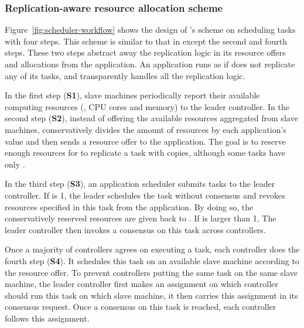 \vspace{-.3in}
\subsubsection{Replication-aware resource allocation scheme}
\label{sec:workflow}\vspace{-.075in}

Figure~\ref{fig:scheduler-workflow} shows the design of \tripod's scheme on 
scheduling tasks with four steps. This scheme is similar to that in \mesos 
except the second and fourth steps. These two steps \tripod abstract away the 
replication logic in its resource offers and allocations from the application. 
An application runs as if \xxx does not replicate any of its tasks, and \tripod 
transparently handles all the replication logic.

In the first step (\textbf{S1}), slave machines periodically report their 
available computing resources (\eg, CPU cores and memory) to the leader 
controller. In the second step (\textbf{S2}), instead of offering the available 
resources aggregated from slave machines, \tripod conservatively divides the 
amount of resources by each application's  value and then sends a 
resource offer to the application. The goal is to reserve enough resources for 
\tripod to replicate a task with  copies, although some tasks have only 
.

In the third step (\textbf{S3}), an application scheduler submits tasks to the 
leader controller. If  is 1, the leader schedules the task without 
consensus and revokes  resources specified in this task from the 
application. By doing so, the conservatively reserved resources are given back 
to \tripod. If  is larger than 1, The leader controller then invokes a 
consensus on this task across controllers.

Once a majority of controllers agrees on executing a task, each controller 
does the fourth step  (\textbf{S4}). It schedules this task on an available 
slave machine according to the resource offer. To prevent controllers putting 
the same task on the same slave machine, the leader controller first makes an 
assignment on which controller should run this task on which slave machine, it 
then carries this assignment in its consensus request. Once a consensus on this 
task is reached, each controller follows this assignment.



